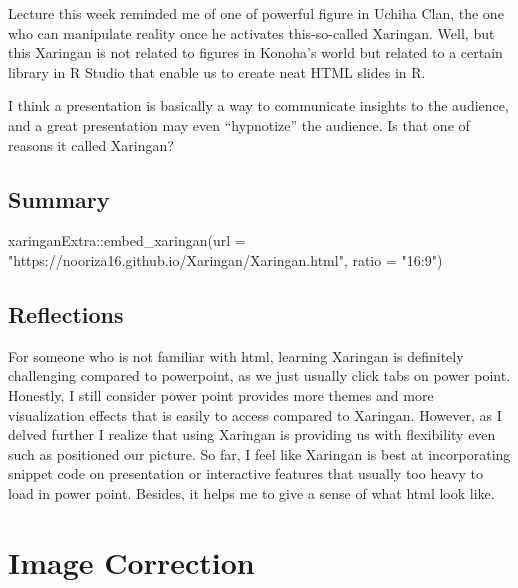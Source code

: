 \documentclass[
  letterpaper,
  DIV=11,
  numbers=noendperiod]{scrreprt}
\newenvironment{Shaded}{\begin{snugshade}}{\end{snugshade}}
\newcommand{\AttributeTok}[1]{\textcolor[rgb]{0.40,0.45,0.13}{#1}}
\newcommand{\FunctionTok}[1]{\textcolor[rgb]{0.28,0.35,0.67}{#1}}
\newcommand{\NormalTok}[1]{\textcolor[rgb]{0.00,0.23,0.31}{#1}}
\newcommand{\SpecialCharTok}[1]{\textcolor[rgb]{0.37,0.37,0.37}{#1}}
\newcommand{\StringTok}[1]{\textcolor[rgb]{0.13,0.47,0.30}{#1}}
\begin{document}
Lecture this week reminded me of one of powerful figure in Uchiha Clan,
the one who can manipulate reality once he activates this-so-called
Xaringan. Well, but this Xaringan is not related to figures in Konoha's
world but related to a certain library in R Studio that enable us to
create neat HTML slides in R.

I think a presentation is basically a way to communicate insights to the
audience, and a great presentation may even ``hypnotize'' the audience.
Is that one of reasons it called Xaringan?

\hypertarget{summary-1}{%
\section{Summary}\label{summary-1}}

\begin{Shaded}
\begin{Highlighting}[]
\NormalTok{xaringanExtra}\SpecialCharTok{::}\FunctionTok{embed\_xaringan}\NormalTok{(}\AttributeTok{url =} \StringTok{"https://nooriza16.github.io/Xaringan/Xaringan.html"}\NormalTok{, }\AttributeTok{ratio =} \StringTok{"16:9"}\NormalTok{)}
\end{Highlighting}
\end{Shaded}

\hypertarget{reflections}{%
\section{Reflections}\label{reflections}}

For someone who is not familiar with html, learning Xaringan is
definitely challenging compared to powerpoint, as we just usually click
tabs on power point. Honestly, I still consider power point provides
more themes and more visualization effects that is easily to access
compared to Xaringan. However, as I delved further I realize that using
Xaringan is providing us with flexibility even such as positioned our
picture. So far, I feel like Xaringan is best at incorporating snippet
code on presentation or interactive features that usually too heavy to
load in power point. Besides, it helps me to give a sense of what html
look like.


\hypertarget{image-correction}{%
\chapter{Image Correction}\label{image-correction}}
\end{document}
